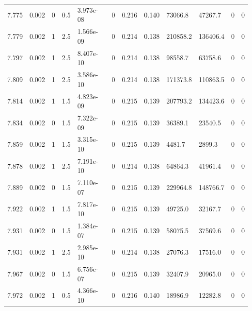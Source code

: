 \documentclass[preview]{standalone}
\begin{document}
{{{{{{{{{{{{{\begin{tabular}{L{1.2cm}C{1.2cm} C{0.3cm}C{0.5cm} C{1.4cm}C{1.4cm} C{1.4cm}C{1.4cm} C{1.6cm}C{1.6cm} C{1.6cm}C{1.6cm}}
  7.775  &  0.002  & 0     & 0.5 &  3.973e-08  & 0  &  0.216&   0.140& 73066.8 & 47267.7   &  0 & 0  \\ 
  7.779  &  0.002  & 1     & 2.5 &  1.566e-09  & 0  &  0.214&   0.138& 210858.2 & 136406.4   &  0 & 0  \\ 
  7.797  &  0.002  & 1     & 2.5 &  8.407e-10  & 0  &  0.214&   0.138& 98558.7 & 63758.6   &  0 & 0  \\ 
  7.809  &  0.002  & 1     & 2.5 &  3.586e-10  & 0  &  0.214&   0.138& 171373.8 & 110863.5   &  0 & 0  \\ 
  7.814  &  0.002  & 1     & 1.5 &  4.823e-09  & 0  &  0.215&   0.139& 207793.2 & 134423.6   &  0 & 0  \\ 
  7.834  &  0.002  & 0     & 1.5 &  7.322e-09  & 0  &  0.215&   0.139& 36389.1 & 23540.5   &  0 & 0  \\ 
  7.859  &  0.002  & 1     & 1.5 &  3.315e-10  & 0  &  0.215&   0.139& 4481.7 & 2899.3   &  0 & 0  \\ 
  7.878  &  0.002  & 1     & 2.5 &  7.191e-10  & 0  &  0.214&   0.138& 64864.3 & 41961.4   &  0 & 0  \\ 
  7.889  &  0.002  & 0     & 1.5 &  7.110e-07  & 0  &  0.215&   0.139& 229964.8 & 148766.7   &  0 & 0  \\ 
  7.922  &  0.002  & 1     & 1.5 &  7.817e-10  & 0  &  0.215&   0.139& 49725.0 & 32167.7   &  0 & 0  \\ 
  7.931  &  0.002  & 0     & 1.5 &  1.384e-07  & 0  &  0.215&   0.139& 58075.5 & 37569.6   &  0 & 0  \\ 
  7.931  &  0.002  & 1     & 2.5 &  2.985e-10  & 0  &  0.214&   0.138& 27076.3 & 17516.0   &  0 & 0  \\ 
  7.967  &  0.002  & 0     & 1.5 &  6.756e-07  & 0  &  0.215&   0.139& 32407.9 & 20965.0   &  0 & 0  \\ 
  7.972  &  0.002  & 1     & 0.5 &  4.366e-10  & 0  &  0.216&   0.140& 18986.9 & 12282.8   &  0 & 0  \\ 
\hline 
\end{tabular} 

}}}}}}}}}}}}}
\end{document}
